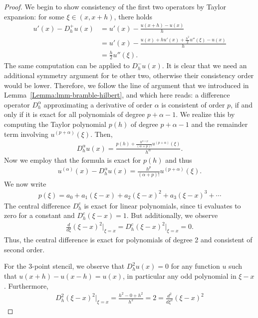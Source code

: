 


\begin{proof}
  We begin to show consistency of the first two operators by Taylor
  expansion: for some $\xi\in(x,x+h)$, there holds
  \begin{align*}
    u'(x) - D^+_h u(x) &= u'(x) - \frac{u(x+h) - u(x)}h \\
    &= u'(x) - \frac{u(x)+h u'(x) + \tfrac{h^2}{2} u''(\xi) - u(x)}h
    \\
    &= \tfrac h2 u''(\xi).
  \end{align*}
  The same computation can be applied to $D^-_h u(x)$. It is clear
  that we need an additional symmetry argument for te other two,
  otherwise their consistency order would be lower. Therefore, we
  follow the line of argument that we introduced in
  Lemma~\ref{Lemma:lmm-bramble-hilbert}, and which here reads: a
  difference operator $D^\alpha_h$ approximating a derivative of order
  $\alpha$ is consistent of order $p$, if and only if it is exact for all
  polynomials of degree $p+\alpha-1$. We realize this by computing the
  Taylor polynomial $p(h)$ of degree $p+\alpha-1$ and the remainder term
  involving $u^{(p+\alpha)}(\xi)$. Then,
  \begin{gather*}
    D^\alpha_h u(x) = \frac{p(h)+\frac{h^{\alpha+p}}{(\alpha+p)!}u^{(p+\alpha)}(\xi)}{h^\alpha}.
  \end{gather*}
  Now we employ that the formula is exact for $p(h)$ and thus
  \begin{gather*}
    u^{(\alpha)}(x) - D^\alpha_h u(x)
    = \frac{h^p}{(\alpha+p)!}u^{(p+\alpha)}(\xi).
  \end{gather*}
  We now write
  \begin{gather*}
    p(\xi) = a_0 + a_1 (\xi-x) + a_2 (\xi-x)^2 + a_3 (\xi-x)^3 + \cdots
  \end{gather*}
  The central difference $D^c_h$ is exact for linear polynomials,
  since ti evaluates to zero for a constant and $D^c_h (\xi-x) =
  1$. But additionally, we observe
  \begin{gather*}
    \frac{d}{d\xi} (\xi-x)^2 \Bigr|_{\xi=x}
    = D^c_h (\xi-x)^2 \Bigr|_{\xi=x}= 0.
  \end{gather*}
  Thus, the central difference is exact for polynomials of degree 2
  and consistent of second order.

  For the 3-point stencil, we observe that $D^2_h u(x)=0$ for any
  function $u$ such that $u(x+h) - u(x-h) = u(x)$, in particular any
  odd polynomial in $\xi-x$. Furthermore,
  \begin{gather*}
    D^2_h  (\xi-x)^2 \Bigr|_{\xi=x}= \frac{h^2-0+h^2}{h^2}
    = 2 = \frac{d^2}{d\xi^2} (\xi-x)^2
  \end{gather*}
\end{proof}

